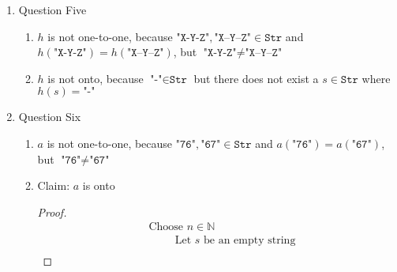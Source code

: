 \documentclass{article}
\begin{document}
\begin{enumerate}
\begin{enumerate}
\begin{proof}
\begin{align}
                &\hspace{3cm} \text{Since } - x_1 = - x_2 \text{, we know } x_1 = x_2 \\
                &\hspace{2cm} \text{In the case of $- (x_1 - 3) = - (x_2 - 3)$, we proved $x_1 = x_2$,} \\
                &\hspace{2cm} \text{which contradicts our assumption} \nonumber \\
                &\hspace{2cm} \text{In any case of } (x_1 - 3)^2 = (x_2 - 3)^2 \text{, we proved an impossibility of } x_1 \neq x_2 \\
                &\hspace{1cm} \text{Under the assumption of } x_1 \neq x_2 \text{, we proved an impossibility, so } x_1 = x_2 \\
                &\text{Under the assumption of } k_2(x_1) = k_2(x_2) \text{, we proved } x_1 = x_2 \text{, so $k_2$ is one-to-one}
            \end{align}
        \end{proof}
    \end{enumerate}
    \item Question Five
    \begin{enumerate}
        \item $h$ is not one-to-one, because $\texttt{"X-Y-Z"}, \texttt{"X--Y--Z"} \in \texttt{Str}$ and $h(\texttt{"X-Y-Z"}) = h(\texttt{"X--Y--Z"})$, but $\texttt{"X-Y-Z"} \neq \texttt{"X--Y--Z"}$
        \item $h$ is not onto, because $\texttt{"-"} \in \texttt{Str}$ but there does not exist a $s \in \texttt{Str}$ where $h(s) = \texttt{"-"}$
    \end{enumerate}
    \item Question Six
    \begin{enumerate}
        \item $a$ is not one-to-one, because $\texttt{"76"},\texttt{"67"} \in \texttt{Str}$ and $a(\texttt{"76"}) = a(\texttt{"67"})$, but $\texttt{"76"} \neq \texttt{"67"}$
        \item Claim: $a$ is onto
        \begin{proof}
            \begin{align}
                &\text{Choose } n \in \mathbb{N} \\
                &\hspace{1cm} \text{Let } s \text{ be an empty string} \\

\end{align}
\end{proof}
\end{enumerate}
\end{enumerate}
\end{document}
